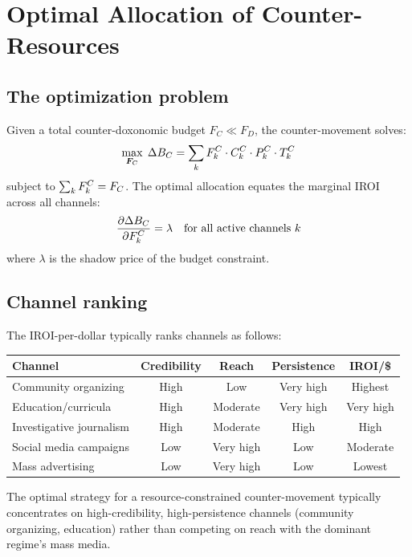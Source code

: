 \section{Optimal Allocation of Counter-Resources}
\label{sec:ch31-optimal}

\subsection{The optimization problem}

\begin{model}
\label{mod:counter-optimal}
Given a total counter-doxonomic budget $F_C \ll F_D$, the counter-movement solves:
\[
  \max_{\bm{F}_C} \; \Delta B_{C} = \sum_k F_{k}^C \cdot C_{k}^C \cdot P_{k}^C \cdot T_{k}^C
\]
subject to $\sum_k F_{k}^C = F_C$.
The optimal allocation equates the marginal IROI across all channels:
\[
  \frac{\partial \Delta B_{C}}{\partial F_{k}^C} = \lambda \quad \text{for all active channels } k
\]
where $\lambda$ is the shadow price of the budget constraint.
\end{model}

\subsection{Channel ranking}

The IROI-per-dollar typically ranks channels as follows:

\begin{center}
\begin{tabular}{lcccc}
\toprule
Channel & Credibility & Reach & Persistence & IROI/\$ \\
\midrule
Community organizing & High & Low & Very high & Highest \\
Education/curricula & High & Moderate & Very high & Very high \\
Investigative journalism & High & Moderate & High & High \\
Social media campaigns & Low & Very high & Low & Moderate \\
Mass advertising & Low & Very high & Low & Lowest \\
\bottomrule
\end{tabular}
\end{center}

The optimal strategy for a resource-constrained counter-movement typically concentrates on high-credibility, high-persistence channels (community organizing, education) rather than competing on reach with the dominant regime's mass media.

